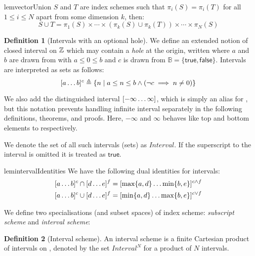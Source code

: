 \documentclass[acmlarge,review,anonymous]{acmart}\settopmatter{printfolios=true}
\theoremstyle{definition}
\newtheorem{defn}{Definition}
\theoremstyle{plain}
\theoremstyle{remark}
\begin{document}
\begin{restatable}{lem}{vectorUnion}
\label{lem:vector-union}
$S$ and $T$ are index schemes such that $\pi_i(S) = \pi_i(T)$ for all $1 \leq i
\leq N$ apart from some dimension $k$, then:
%
  \begin{equation*}
    S \cup  T
    =
    \pi_1(S) \times \cdots \times
    (\pi_k(S) \cup \pi_k(T)) \times \cdots \times
    \pi_N(S)
  \end{equation*}
\end{restatable}
%
\begin{defn}[Intervals with an optional hole]
  We define an extended notion of closed interval on $\textnormal{$\mathbb{Z}$}{}$ which may contain a
  \emph{hole} at the origin, written  where $a$ and $b$ are
  drawn from \bz{} with $a \leq 0 \leq b$ and $c$ is drawn from $\mathbb{B} = \{
  \mathsf{true}, \mathsf{false} \}$. Intervals are interpreted as sets as
  follows:
%
  \begin{equation*}
    \textnormal{$\lbrack a\ldots b\rbrack^{c}$} \triangleq
      \{ n \mid a \leq n \leq b \wedge (\neg c \implies n \neq 0) \}
  \end{equation*}

  We also add the distinguished interval $\textnormal{$\lbrack-\infty\ldots\infty\rbrack^{}$}$, which is simply an
  alias for \bz{}, but this notation prevents handling infinite interval
  separately in the following definitions, theorems, and proofs. Here, $-\infty$
  and $\infty$ behaves like top and bottom elements to \bz{} respectively.

  We denote the set of all such intervals (sets) as $\textit{Interval}$. If the
  superscript to the interval is omitted it is treated as $\mathsf{true}$.
\end{defn}
%
\begin{restatable}{lem}{intervalIdentities}
 \label{lem:interval-identities}
  We have the following dual identities for \bz{} intervals:
%
  \begin{align*}
    \textnormal{$\lbrack a\ldots b\rbrack^{c}$} \cap \textnormal{$\lbrack d\ldots e\rbrack^{f}$} & =
      \textnormal{$\lbrack\max \{a,d\}\ldots\min \{b,e\}\rbrack^{c \wedge f}$} \\
    \textnormal{$\lbrack a\ldots b\rbrack^{c}$} \cup \textnormal{$\lbrack d\ldots e\rbrack^{f}$} & =
      \textnormal{$\lbrack\min \{a,d\}\ldots\max \{b,e\}\rbrack^{c \vee f}$}
  \end{align*}
\end{restatable}
%

We define two specialisations (and subset spaces) of index scheme:
\emph{subscript scheme} and \emph{interval scheme}:

\begin{defn}[Interval scheme]
  An interval scheme is a finite Cartesian product of intervals on \bz{},
  denoted by the set $\textit{Interval}^N$ for a product of $N$ intervals.
\end{defn}
\end{document}
